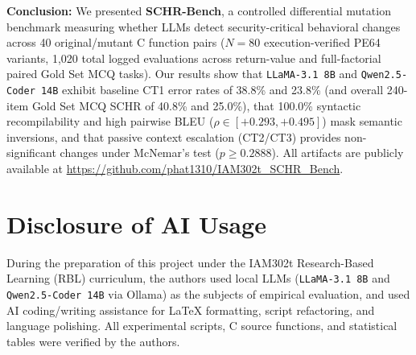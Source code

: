 \documentclass[conference]{IEEEtran}
\begin{document}
\textbf{Conclusion:} We presented \textbf{SCHR-Bench}, a controlled differential mutation benchmark measuring whether LLMs detect security-critical behavioral changes across 40 original/mutant C function pairs ($N=80$ execution-verified PE64 variants, 1,020 total logged evaluations across return-value and full-factorial paired Gold Set MCQ tasks). Our results show that \texttt{LLaMA-3.1 8B} and \texttt{Qwen2.5-Coder 14B} exhibit baseline CT1 error rates of 38.8\% and 23.8\% (and overall 240-item Gold Set MCQ SCHR of 40.8\% and 25.0\%), that 100.0\% syntactic recompilability and high pairwise BLEU ($\rho \in [+0.293, +0.495]$) mask semantic inversions, and that passive context escalation (CT2/CT3) provides non-significant changes under McNemar's test ($p \ge 0.2888$). All artifacts are publicly available at \url{https://github.com/phat1310/IAM302t_SCHR_Bench}.

\section*{Disclosure of AI Usage}
During the preparation of this project under the IAM302t Research-Based Learning (RBL) curriculum, the authors used local LLMs (\texttt{LLaMA-3.1 8B} and \texttt{Qwen2.5-Coder 14B} via Ollama) as the subjects of empirical evaluation, and used AI coding/writing assistance for LaTeX formatting, script refactoring, and language polishing. All experimental scripts, C source functions, and statistical tables were verified by the authors.

\balance


\end{document}
